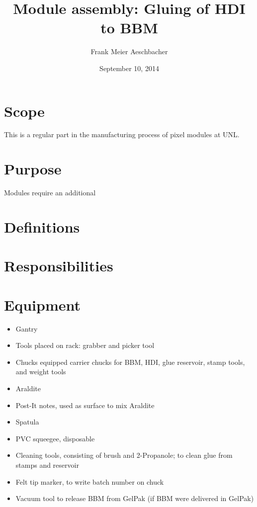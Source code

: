 \documentclass[12pt]{unlsilabsop}
\title{Module assembly: Gluing of HDI to BBM}
\date{September 10, 2014}
\author{Frank Meier Aeschbacher}
\begin{document}
\maketitle

\section{Scope}
This is a regular part in the manufacturing process of pixel modules at UNL.

\section{Purpose}
Modules require an additional

\section{Definitions}

\section{Responsibilities}

\section{Equipment}

\begin{itemize}
    \item Gantry
    \item Tools placed on rack: grabber and picker tool
    \item Chucks equipped carrier chucks for BBM, HDI, glue reservoir, stamp tools, and weight tools
    \item Araldite
    \item Post-It notes, used as surface to mix Araldite
    \item Spatula
    \item PVC squeegee, disposable
    \item Cleaning tools, consisting of brush and 2-Propanole; to clean glue from stamps and reservoir
    \item Felt tip marker, to write batch number on chuck
    \item Vacuum tool to release BBM from GelPak (if BBM were delivered in GelPak)
\end{itemize}
\end{document}
